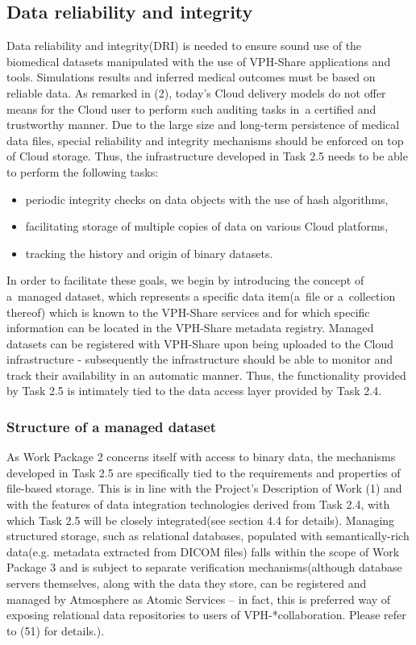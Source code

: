 \documentclass[a4paper,12pt,titlepage]{article}
\begin{document}
\subsection{Data reliability and integrity}
Data reliability and integrity(DRI) is needed to ensure sound use of the biomedical datasets manipulated with the use of VPH-Share applications and tools. Simulations results and inferred medical outcomes must be based on reliable data. As remarked in (2), today's Cloud delivery models do not offer means for the Cloud user to perform such auditing tasks in~a certified and trustworthy manner. Due to the large size and long-term persistence of medical data files, special reliability and integrity mechanisms should be enforced on top of Cloud storage. Thus, the infrastructure developed in Task 2.5 needs to be able to perform the following tasks:

\begin{itemize}
\item periodic integrity checks on data objects with the use of hash algorithms,
\item facilitating storage of multiple copies of data on various Cloud platforms,
\item tracking the history and origin of binary datasets.
\end{itemize}

\noindent
In order to facilitate these goals, we begin by introducing the concept of a~managed dataset, which represents a specific data item(a~file or a~collection thereof) which is known to the VPH-Share services and for which specific information can be located in the VPH-Share metadata registry. Managed datasets can be registered with VPH-Share upon being uploaded to the Cloud infrastructure - subsequently the infrastructure should be able to monitor and track their availability in an automatic manner. Thus, the functionality provided by Task 2.5 is intimately tied to the data access layer provided by Task 2.4.

\subsubsection{Structure of a managed dataset}
As Work Package 2 concerns itself with access to binary data, the mechanisms developed in Task 2.5 are specifically tied to the requirements and properties of file-based storage. This is in line with the Project's Description of Work (1) and with the features of data integration technologies derived from Task 2.4, with which Task 2.5 will be closely integrated(see section 4.4 for details). Managing structured storage, such as relational databases, populated with semantically-rich data(e.g. metadata extracted from DICOM files) falls within the scope of Work Package 3 and is subject to separate verification mechanisms(although database servers themselves, along with the data they store, can be registered and managed by Atmosphere as Atomic Services -- in fact, this is preferred way of exposing relational data repositories to users of VPH-*collaboration. Please refer to (51) for details.).\\
	   
\end{document}
